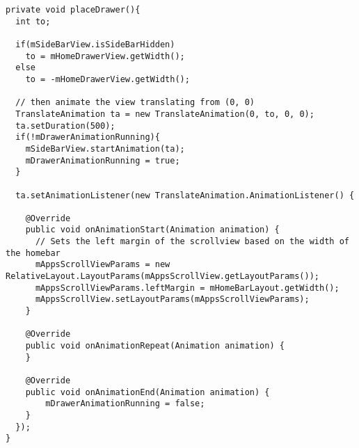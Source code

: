 \begin{lstlisting}[caption={Using the animation of the drawer from the home activity.},label={lst:draweranimation:homeactivity}]
private void placeDrawer(){
  int to;

  if(mSideBarView.isSideBarHidden)
    to = mHomeDrawerView.getWidth();
  else
    to = -mHomeDrawerView.getWidth();

  // then animate the view translating from (0, 0)
  TranslateAnimation ta = new TranslateAnimation(0, to, 0, 0);
  ta.setDuration(500);
  if(!mDrawerAnimationRunning){
    mSideBarView.startAnimation(ta);
    mDrawerAnimationRunning = true;
  }

  ta.setAnimationListener(new TranslateAnimation.AnimationListener() {

    @Override
    public void onAnimationStart(Animation animation) {
      // Sets the left margin of the scrollview based on the width of the homebar
      mAppsScrollViewParams = new RelativeLayout.LayoutParams(mAppsScrollView.getLayoutParams());
      mAppsScrollViewParams.leftMargin = mHomeBarLayout.getWidth();
      mAppsScrollView.setLayoutParams(mAppsScrollViewParams);
    }

    @Override
    public void onAnimationRepeat(Animation animation) {
    }

    @Override
    public void onAnimationEnd(Animation animation) {
        mDrawerAnimationRunning = false;
    }
  });
}
\end{lstlisting}





